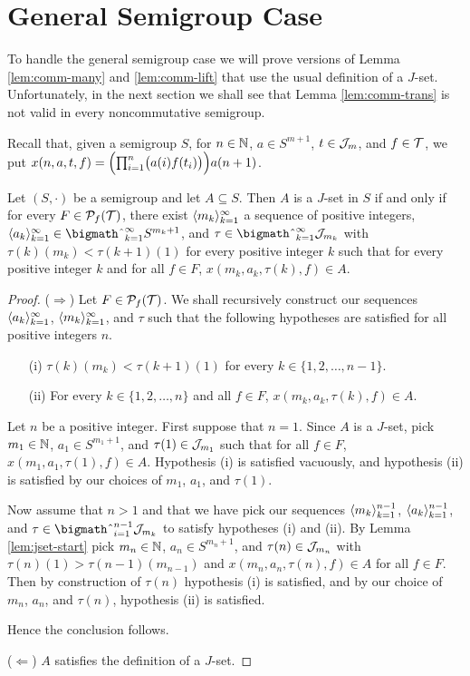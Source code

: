 \section{General Semigroup Case}
To handle the general semigroup case we will prove versions of Lemma \ref{lem:comm-many} and \ref{lem:comm-lift} that use the usual definition of a $J$-set. 
Unfortunately, in the next section we shall see that Lemma \ref{lem:comm-trans} is not valid in every noncommutative semigroup. 

Recall that, given a semigroup $S$, for $n \in \mathbb{N}$, $a \in S^{m+1}$, $t \in \mathcal{J}_m$, and $f \in \mathcal{T}$, we put $x(n, a, t, f) = \Bigl( \prod_{i=1}^n \bigl( a(i) f(t_i) \bigr) \Bigr) a(n+1)$. 

\begin{lem}
  \label{lem:many}
  Let $(S, \cdot)$ be a semigroup and let $A \subseteq S$.
  Then $A$ is a $J$-set in $S$ if and only if for every $F \in \mathcal{P}_f(\mathcal{T})$, there exist $\langle m_k \rangle_{k=1}^\infty$ a sequence of positive integers, $\la a_k \ra_{k=1}^\infty \in \bigtimes_{k=1}^\infty S^{m_k+1}$, and $\tau \in \bigtimes_{k=1}^\infty \calJ_{m_k}$ with $\tau(k)(m_k) < \tau(k+1)(1)$ for every positive integer $k$ such that for every positive integer $k$ and for all $f \in F$, $x(m_k, a_k, \tau(k), f) \in A$.
\end{lem}
\begin{proof}
  ($\Rightarrow$)
  Let $F \in \mathcal{P}_f(\mathcal{T})$.
  We shall recursively construct our sequences $\langle a_k \rangle_{k=1}^\infty$, $\langle m_k \rangle_{k=1}^\infty$, and $\tau$ such that the following hypotheses are satisfied for all positive integers $n$. 
  \begin{itemize}
    \item[(i)]
      $\tau(k)(m_k) < \tau(k+1)(1)$ for every $k \in \{1, 2, \ldots, n-1\}$.

    \item[(ii)]
      For every $k \in \{1, 2, \ldots, n\}$ and all $f \in F$, $x(m_k, a_k, \tau(k), f) \in A$.
  \end{itemize}
  
  Let $n$ be a positive integer.
  First suppose that $n = 1$. 
  Since $A$ is a $J$-set, pick $m_1 \in \mathbb{N}$, $a_1 \in S^{m_1+1}$, and $\tau(1) \in \mathcal{J}_{m_1}$ such that for all $f \in F$, $x(m_1, a_1, \tau(1), f) \in A$. 
  Hypothesis (i) is satisfied vacuously, and hypothesis (ii) is satisfied by our choices of $m_1$, $a_1$, and $\tau(1)$. 

  Now assume that $n > 1$ and that we have pick our sequences $\langle m_k \rangle_{k=1}^{n-1}$, $\langle a_k \rangle_{k=1}^{n-1}$, and $\tau \in \bigtimes_{i=1}^{n-1} \calJ_{m_k}$ to satisfy hypotheses (i) and (ii). 
  By Lemma \ref{lem:jset-start} pick $m_n \in \mathbb{N}$, $a_n \in S^{m_n+1}$, and $\tau(n) \in \mathcal{J}_{m_n}$ with $\tau(n)(1) > \tau(n-1)(m_{n-1})$ and $x(m_n, a_n, \tau(n), f) \in A$ for all $f \in F$. 
  Then by construction of $\tau(n)$ hypothesis (i) is satisfied, and by our choice of $m_n$, $a_n$, and $\tau(n)$, hypothesis (ii) is satisfied. 

  Hence the conclusion follows. 

  ($\Leftarrow$)
  $A$ satisfies the definition of a $J$-set.
\end{proof}

